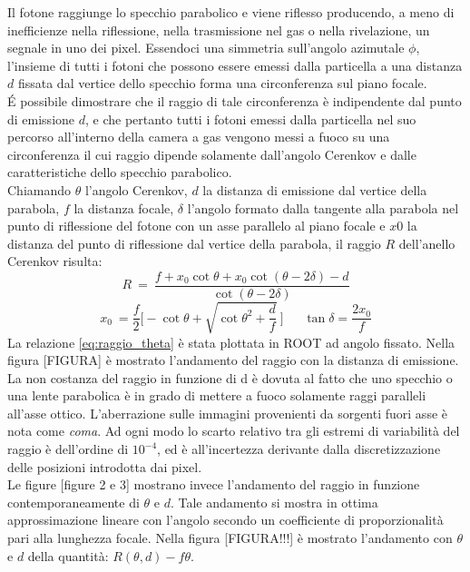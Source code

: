 \documentclass[8pt]{extarticle}
\begin{document}
Il fotone raggiunge lo specchio parabolico e viene riflesso producendo, a meno di inefficienze nella riflessione, nella trasmissione nel gas o nella rivelazione, un segnale in uno dei pixel. Essendoci una simmetria sull'angolo azimutale $\phi$, l'insieme di tutti i fotoni che possono essere emessi dalla particella a una distanza $d$ fissata dal vertice dello specchio forma una circonferenza sul piano focale.\\
\'E possibile dimostrare che il raggio di tale circonferenza è indipendente dal punto di emissione $d$, e che pertanto tutti i fotoni emessi dalla particella nel suo percorso all'interno della camera a gas vengono messi a fuoco su una circonferenza il cui raggio dipende solamente dall'angolo Cerenkov e dalle caratteristiche dello specchio parabolico.\\
Chiamando $\theta$ l'angolo Cerenkov, $d$ la distanza di emissione dal vertice della parabola, $f$ la distanza focale, $\delta$ l'angolo formato dalla tangente alla parabola nel punto di riflessione del fotone con un asse parallelo al piano focale e $x0$ la distanza del punto di riflessione dal vertice della parabola, il raggio $R$ dell'anello Cerenkov risulta:
\begin{equation} \label{eq:raggio_theta}
R \ = \ \frac{f+x_0 \cot{\theta}+x_0 \cot{(\theta-2\delta)}-d}{\cot{(\theta-2\delta)}}
\end{equation}
\begin{equation}
x_0 \ = \frac{f}{2} \Bigg[-\cot{\theta}+\sqrt{\cot{\theta}^2+\frac{d}{f}}\ \Bigg] \ \ \ \ \ \ \ \tan{\delta}=\frac{2x_0}{f}
\end{equation}
La relazione \ref{eq:raggio_theta} è stata plottata in ROOT ad angolo fissato. Nella figura [FIGURA] è mostrato l'andamento del raggio con la distanza di emissione.\\
La non costanza del raggio in funzione di d è dovuta al fatto che uno specchio o una lente parabolica è in grado di mettere a fuoco solamente raggi paralleli all'asse ottico. L'aberrazione sulle immagini provenienti da sorgenti fuori asse è nota come \textit{coma}.
Ad ogni modo lo scarto relativo tra gli estremi di variabilità del raggio è dell'ordine di $10^{-4}$, ed è all'incertezza derivante dalla discretizzazione delle posizioni introdotta dai pixel.\\
Le figure [figure 2 e 3] mostrano invece l'andamento del raggio in funzione contemporaneamente di $\theta$ e $d$. Tale andamento si mostra in ottima approssimazione lineare con l'angolo secondo un coefficiente di proporzionalità pari alla lunghezza focale. Nella figura [FIGURA!!!] è mostrato l'andamento con $\theta$ e $d$ della quantità: $R(\theta,d)-f\theta$.
\end{document}
